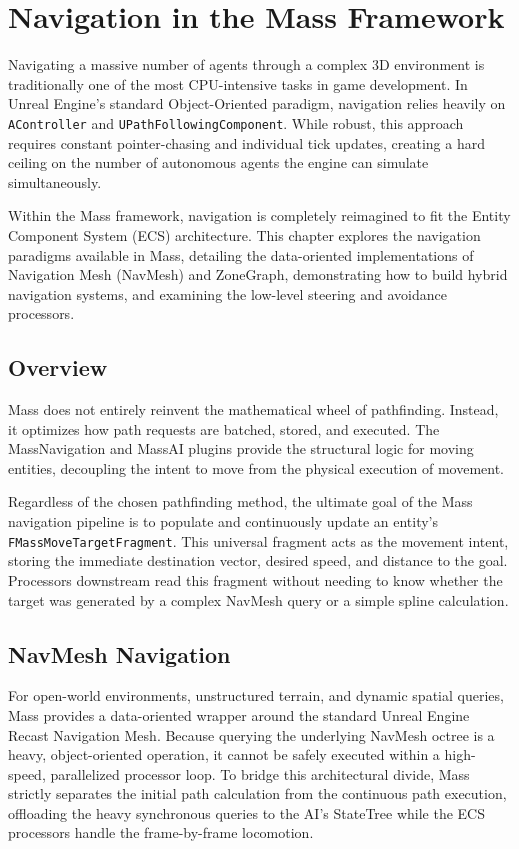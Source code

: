 \chapter{Navigation in the Mass Framework}
\label{sec:Navigation}

Navigating a massive number of agents through a complex 3D environment is traditionally one of the most CPU-intensive tasks in game development. In Unreal Engine's standard Object-Oriented paradigm, navigation relies heavily on \texttt{AController} and \texttt{UPathFollowingComponent}. While robust, this approach requires constant pointer-chasing and individual tick updates, creating a hard ceiling on the number of autonomous agents the engine can simulate simultaneously.

Within the Mass framework, navigation is completely reimagined to fit the Entity Component System (ECS) architecture. This chapter explores the navigation paradigms available in Mass, detailing the data-oriented implementations of Navigation Mesh (NavMesh) and ZoneGraph, demonstrating how to build hybrid navigation systems, and examining the low-level steering and avoidance processors.


\section{Overview}

Mass does not entirely reinvent the mathematical wheel of pathfinding. Instead, it optimizes how path requests are batched, stored, and executed. The MassNavigation and MassAI plugins provide the structural logic for moving entities, decoupling the intent to move from the physical execution of movement.

Regardless of the chosen pathfinding method, the ultimate goal of the Mass navigation pipeline is to populate and continuously update an entity's \newline\texttt{FMassMoveTargetFragment}. This universal fragment acts as the movement intent, storing the immediate destination vector, desired speed, and distance to the goal. Processors downstream read this fragment without needing to know whether the target was generated by a complex NavMesh query or a simple spline calculation.

\section{NavMesh Navigation}

For open-world environments, unstructured terrain, and dynamic spatial queries, Mass provides a data-oriented wrapper around the standard Unreal Engine Recast Navigation Mesh. Because querying the underlying NavMesh octree is a heavy, object-oriented operation, it cannot be safely executed within a high-speed, parallelized processor loop. To bridge this architectural divide, Mass strictly separates the initial path calculation from the continuous path execution, offloading the heavy synchronous queries to the AI's StateTree while the ECS processors handle the frame-by-frame locomotion.

